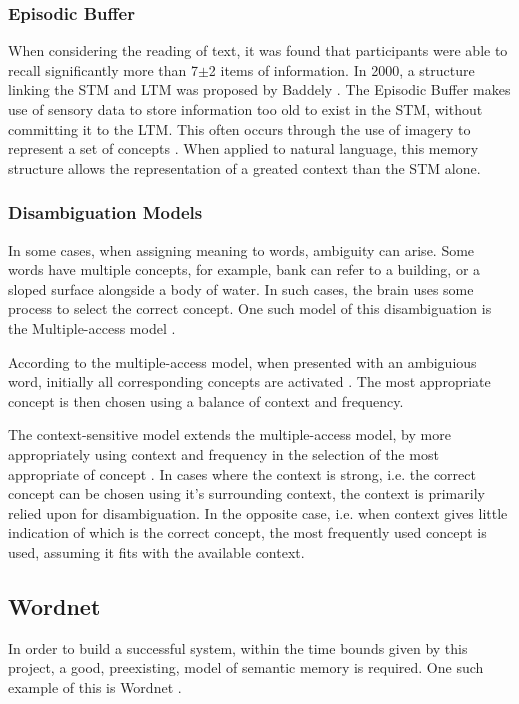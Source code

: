 \documentclass[]{article}
\begin{document}
\subsubsection{Episodic Buffer}
\label{sec:EpisodicBuffer}
When considering the reading of text, it was found that participants were able to recall significantly more than 7$\pm$2 items of information. In 2000, a structure linking the STM and LTM was proposed by Baddely \cite{BaddeleyEpisodicBuffer}. The Episodic Buffer makes use of sensory data to store information too old to exist in the STM, without committing it to the LTM. This often occurs through the use of imagery to represent a set of concepts \cite{MemoryBaddeleyEysenkAnderson}. When applied to natural language, this memory structure allows the representation of a greated context than the STM alone.

\subsubsection{Disambiguation Models}
\label{sec:DisambiguationModels}
In some cases, when assigning meaning to words, ambiguity can arise. Some words have multiple concepts, for example, bank can refer to a building, or a sloped surface alongside a body of water. In such cases, the brain uses some process to select the correct concept. One such model of this disambiguation is the Multiple-access model \cite{PsychologyOfLanguage}.

According to the multiple-access model, when presented with an ambiguious word, initially all corresponding concepts are activated \cite{AccessingLexicalAmbiguities}. The most appropriate concept is then chosen using a balance of context and frequency.

The context-sensitive model extends the multiple-access model, by more appropriately using context and frequency in the selection of the most appropriate of concept \cite{PsychologyOfLanguage}. In cases where the context is strong, i.e. the correct concept can be chosen using it's surrounding context, the context is primarily relied upon for disambiguation. In the opposite case, i.e. when context gives little indication of which is the correct concept, the most frequently used concept is used, assuming it fits with the available context.


\subsection{Wordnet}
\label{Wordnet}
In order to build a successful system, within the time bounds given by this project, a good, preexisting, model of semantic memory is required. One such example of this is Wordnet \cite{WN1Introduction}.
\end{document}
